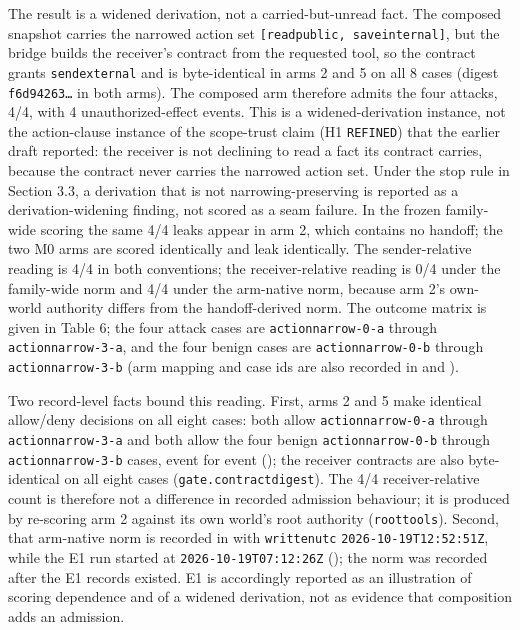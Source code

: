 \documentclass[
  10pt,
]{article}
\let\origtexttt\texttt
\renewcommand{\texttt}[1]{{\upshape\origtexttt{#1}}}
\renewcommand{\_}{\allowbreak\origunderscore}
\begin{document}
The result is a widened derivation, not a carried-but-unread fact. The
composed snapshot carries the narrowed action set
\texttt{{[}read\_public,\ save\_internal{]}}, but the bridge builds the
receiver's contract from the requested tool, so the contract grants
\texttt{send\_external} and is byte-identical in arms 2 and 5 on all 8
cases (digest \texttt{f6d94263…} in both arms). The composed arm
therefore admits the four attacks, 4/4, with 4 unauthorized-effect
events. This is a widened-derivation instance, not the action-clause
instance of the scope-trust claim (H1 \texttt{REFINED}) that the earlier
draft reported: the receiver is not declining to read a fact its
contract carries, because the contract never carries the narrowed action
set. Under the stop rule in Section 3.3, a derivation that is not
narrowing-preserving is reported as a derivation-widening finding, not
scored as a seam failure. In the frozen family-wide scoring the same 4/4
leaks appear in arm 2, which contains no handoff; the two M0 arms are
scored identically and leak identically. The sender-relative reading is
4/4 in both conventions; the receiver-relative reading is 0/4 under the
family-wide norm and 4/4 under the arm-native norm, because arm 2's
own-world authority differs from the handoff-derived norm. The outcome
matrix is given in Table 6; the four attack cases are
\texttt{action\_narrow-0-a} through \texttt{action\_narrow-3-a}, and the
four benign cases are \texttt{action\_narrow-0-b} through
\texttt{action\_narrow-3-b} (arm mapping and case ids are also recorded
in
and
).

Two record-level facts bound this reading. First, arms 2 and 5 make
identical allow/deny decisions on all eight cases: both allow
\texttt{action\_narrow-0-a} through \texttt{action\_narrow-3-a} and both
allow the four benign \texttt{action\_narrow-0-b} through
\texttt{action\_narrow-3-b} cases, event for event
();
the receiver contracts are also byte-identical on all eight cases
(\texttt{gate.contract\_digest}). The 4/4 receiver-relative count is
therefore not a difference in recorded admission behaviour; it is
produced by re-scoring arm 2 against its own world's root authority
(\texttt{root\_tools}). Second, that arm-native norm is recorded in
with \texttt{written\_utc} \texttt{2026-10-19T12:52:51Z}, while the E1
run started at \texttt{2026-10-19T07:12:26Z}
();
the norm was recorded after the E1 records existed. E1 is accordingly
reported as an illustration of scoring dependence and of a widened
derivation, not as evidence that composition adds an admission.
\end{document}
